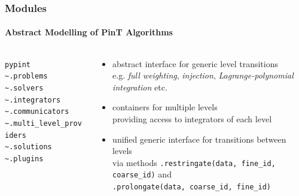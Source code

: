 \documentclass[%
  english,
  hyperref={pdfpagelabels=false},
  aspectratio=1610]{beamer}
\begin{document}
\begin{frame}
  \frametitle{Modules}
  \framesubtitle{Abstract Modelling of PinT Algorithms}
  \vspace{-5em}
  \begin{columns}[T]
    \begin{column}{5cm}
      \color{fzjblue50}%
      \texttt{pypint}\\
      \color{fzjgray30}%
      \hspace{0.75em}\texttt{\textasciitilde.problems}\\
      \hspace{0.75em}\texttt{\textasciitilde.solvers}\\
      \hspace{0.75em}\texttt{\textasciitilde.integrators}\\
      \hspace{0.75em}\texttt{\textasciitilde.communicators}\\
      \color{fzjblue50}%
      \hspace{0.75em}\texttt{\textasciitilde.multi\_level\_providers}\\
      \color{fzjgray30}%
      \hspace{0.75em}\texttt{\textasciitilde.solutions}\\
      \hspace{0.75em}\texttt{\textasciitilde.plugins}
    \end{column}
    \begin{column}{10cm}
      \begin{itemize}
        \item abstract interface for generic level transitions\\
          {\scriptsize e.g. \emph{full weighting}, \emph{injection}, \emph{Lagrange-polynomial integration} etc.\\}
        \item containers for multiple levels\\
          {\scriptsize providing access to integrators of each level\\}
        \item unified generic interface for transitions between levels\\
          {\scriptsize via methods \texttt{.restringate(data, fine\_id, coarse\_id)} and\\[-0.5em]
           \texttt{.prolongate(data, coarse\_id, fine\_id)}}
      \end{itemize}
      

\end{column}
\end{columns}
\end{frame}
\end{document}
